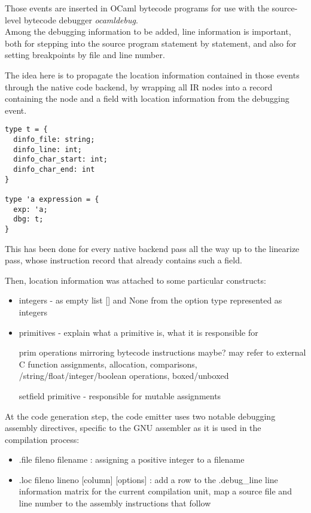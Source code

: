 Those events are inserted in OCaml bytecode programs for use with the source-level bytecode
debugger \textit{ocamldebug}. \\

Among the debugging information to be added, line information is important,
both for stepping into the source program statement by statement,
and also for setting breakpoints by file and line number.

The idea here is to propagate the location information contained in those events
through the native code backend, by wrapping all IR nodes into a record
containing the node and a field with location information from the debugging
event.

\begin{lstlisting}
type t = {
  dinfo_file: string;
  dinfo_line: int;
  dinfo_char_start: int;
  dinfo_char_end: int
}

type 'a expression = {
  exp: 'a;
  dbg: t;
}
\end{lstlisting}

This has been done for every native backend pass all the way up to the linearize
pass, whose instruction record that already contains such a field.

Then, location information was attached to some particular constructs:

\begin{itemize}
    \item integers - as empty list [] and None from the option type represented as integers
    \item
primitives - explain what a primitive is, what it is responsible for

prim operations mirroring bytecode instructions maybe?
may refer to external C function
assignments, allocation, comparisons, /string/float/integer/boolean operations,
boxed/unboxed

setfield primitive - responsible for mutable assignments
\end{itemize}

At the code generation step, the code emitter uses two notable debugging
assembly directives, specific to the GNU assembler as it is used in the
compilation process:


\begin{itemize}
    \item .file fileno filename : assigning a positive integer to a filename
    \item .loc fileno lineno [column] [options] : add a row to the .debug\_line
        line information matrix for the current compilation unit, map a source
        file and line number to the assembly instructions that follow
\end{itemize}

